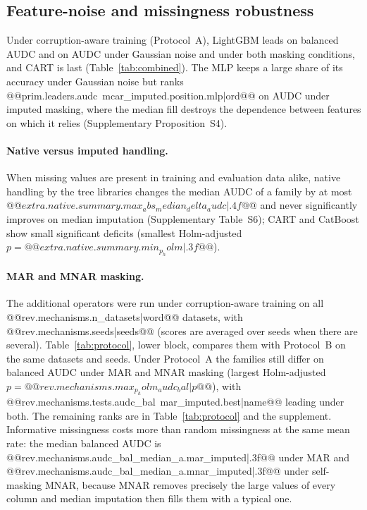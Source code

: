 \documentclass[pdflatex,sn-mathphys]{sn-jnl}
\theoremstyle{thmstyleone}
\theoremstyle{thmstyletwo}
\theoremstyle{thmstylethree}
\begin{document}
\subsection{Feature-noise and missingness robustness}\label{sec:res:feature}

Under corruption-aware training (Protocol~A), LightGBM leads on balanced AUDC and on AUDC under Gaussian noise and under both masking conditions, and CART is last (Table~\ref{tab:combined}). The MLP keeps a large share of its accuracy under Gaussian noise but ranks @@{prim.leaders.audc~mcar_imputed.position.mlp|ord}@@ on AUDC under imputed masking, where the median fill destroys the dependence between features on which it relies (Supplementary Proposition~S4).

\paragraph{Native versus imputed handling.} When missing values are present in training and evaluation data alike, native handling by the tree libraries changes the median AUDC of a family by at most $@@{extra.native.summary.max_abs_median_delta_audc|.4f}@@$ and never significantly improves on median imputation (Supplementary Table~S6); CART and CatBoost show small significant deficits (smallest Holm-adjusted $p=@@{extra.native.summary.min_p_holm|.3f}@@$).

\paragraph{MAR and MNAR masking.} The additional operators were run under corruption-aware training on all @@{rev.mechanisms.n_datasets|word}@@ datasets, with @@{rev.mechanisms.seeds|seeds}@@ (scores are averaged over seeds when there are several). Table~\ref{tab:protocol}, lower block, compares them with Protocol~B on the same datasets and seeds. Under Protocol~A the families still differ on balanced AUDC under MAR and MNAR masking (largest Holm-adjusted $p=@@{rev.mechanisms.max_p_holm_audc_bal|p}@@$), with @@{rev.mechanisms.tests.audc_bal~mar_imputed.best|name}@@ leading under both. The remaining ranks are in Table~\ref{tab:protocol} and the supplement. Informative missingness costs more than random missingness at the same mean rate: the median balanced AUDC is @@{rev.mechanisms.audc_bal_median_a.mar_imputed|.3f}@@ under MAR and @@{rev.mechanisms.audc_bal_median_a.mnar_imputed|.3f}@@ under self-masking MNAR, because MNAR removes precisely the large values of every column and median imputation then fills them with a typical one.
\end{document}

